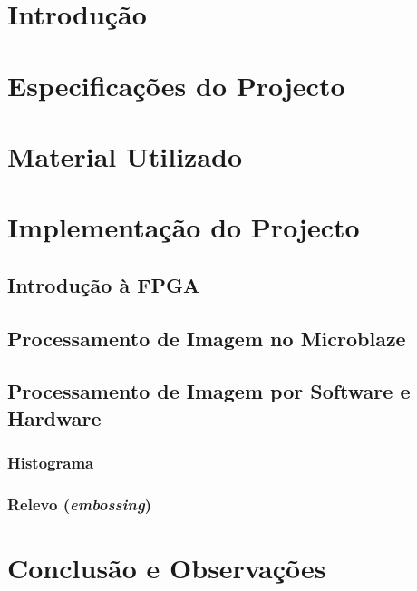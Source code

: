\documentclass[a4paper]{article}
\begin{document}


\tableofcontents
\pagebreak

\section{Introdução}

\section{Especificações do Projecto}

\section{Material Utilizado}

\section{Implementação do Projecto}
\subsection{Introdução à FPGA}

\subsection{Processamento de Imagem no Microblaze\texttrademark}

\subsection{Processamento de Imagem por Software e Hardware}
\subsubsection{Histograma}

\subsubsection{Relevo (\textit{embossing})}

\section{Conclusão e Observações}


\nocite{}
\end{document}
